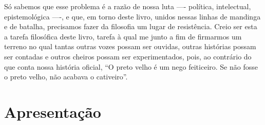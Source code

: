 Só sabemos que esse problema é a razão de nossa luta ---- política,
intelectual, epistemológica ----, e que, em torno deste livro, unidos
nessas linhas de mandinga e de batalha, precisamos fazer da filosofia um
lugar de resistência. Creio ser esta a tarefa filosófica deste livro,
tarefa à qual me junto a fim de firmarmos um terreno no qual tantas
outras vozes possam ser ouvidas, outras histórias possam ser contadas e
outros cheiros possam ser experimentados, pois, ao contrário do que
conta nossa história oficial, ``O preto velho é um nego feiticeiro. Se
não fosse o preto velho, não acabava o cativeiro''.

\chapter{Apresentação}\label{apresentauxe7uxe3o}

